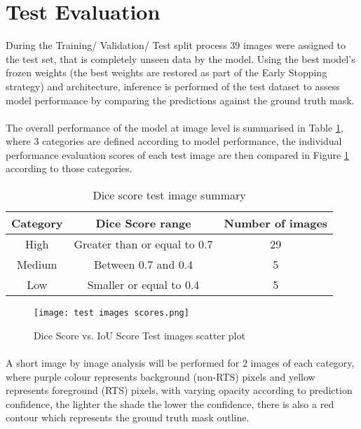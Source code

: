 \section{Test Evaluation}

During the Training/ Validation/ Test split process $39$ images were assigned to the test set, that is completely unseen data by the model. Using the best model's frozen weights (the best weights are restored as part of the Early Stopping strategy) and architecture, inference is performed of the test dataset to assess model performance by comparing the predictions against the ground truth mask.

\paragraph{}
The overall performance of the model at image level is summarised in Table \ref{sum_test}, where $3$ categories are defined according to model performance, the individual performance evaluation scores of each test image are then compared in Figure \ref{scatter_test_scores} according to those categories.

    \begin{table}[ht!] 
        \begin{center}
        \begin{tabular}{ccc} 
        \toprule
        \textbf{Category} & \textbf{Dice Score range}  & \textbf{Number of images}  \\ \midrule
        High & Greater than or equal to 0.7 & 29  \\
        Medium & Between 0.7 and 0.4 & 5  \\
        Low & Smaller or equal to 0.4 & 5  \\
    \bottomrule
        \end{tabular}
      \end{center} 
      \caption{Dice score test image summary}\label{sum_test}
    \end{table}
    \begin{figure}[hbt!]
        \centering
        \texttt{[image: test images scores.png]}
        \caption{Dice Score vs. \gls{IoU} Score Test images scatter plot}
        \label{scatter_test_scores}
    \end{figure}
\paragraph{}
A short image by image analysis will be performed for $2$ images of each category, where purple colour represents background (non-\gls{RTS}) pixels and yellow represents foreground (\gls{RTS}) pixels, with varying opacity according to prediction confidence, the lighter the shade the lower the confidence, there is also a red contour which represents the ground truth mask outline.
